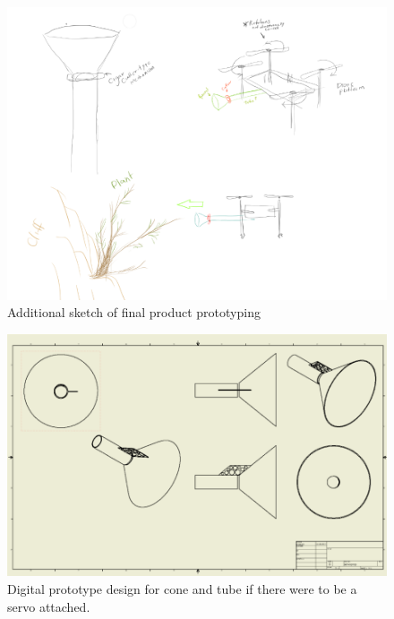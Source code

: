\documentclass{wrcecapstone}
\begin{document}
\begin{figure}
\begin{center}
\includegraphics[width=0.8\columnwidth]{figures/fig7310.png}
\end{center}
\caption{Additional sketch of final product prototyping}
\label{fig:7.3.10}
\end{figure}
\begin{figure}
\begin{center}
\includegraphics[width=\columnwidth]{figures/fig7311.png}
\end{center}
\caption{Digital prototype design for cone and tube if there were to be a servo attached.}
\label{fig:7.3.11}
\end{figure}
\end{document}
